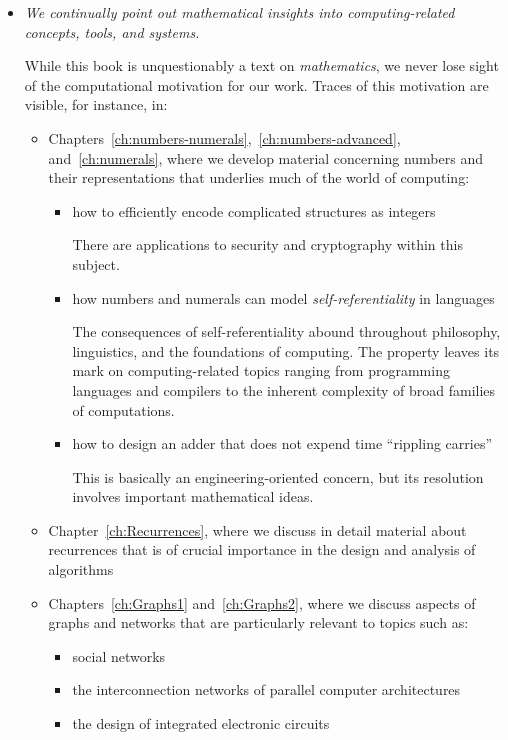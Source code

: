 \begin{itemize}
\item
{\em We continually point out mathematical insights into {\em computing-related} concepts, tools, and systems.}

\smallskip

While this book is unquestionably a text on {\em mathematics}, we never lose sight of the computational motivation for our work.  Traces of this motivation are visible, for instance, in:
  \begin{itemize}
  \item
Chapters~\ref{ch:numbers-numerals},~\ref{ch:numbers-advanced}, and~\ref{ch:numerals}, where we develop material concerning numbers and their representations that underlies much of the world of computing:
     \begin{itemize}
     \medskip\item
how to efficiently encode complicated structures as integers

\smallskip

There are applications to security and cryptography within this subject.
     \smallskip\item
how numbers and numerals can model {\em self-referentiality} in languages

\smallskip

The consequences of self-referentiality abound throughout philosophy, linguistics, and the foundations of computing.  The property leaves its mark on computing-related topics ranging from programming languages and compilers to the inherent complexity of broad families of computations.
     \medskip\item
how to design an adder that does not expend time ``rippling carries''

\smallskip

This is basically an engineering-oriented concern, but its resolution involves important mathematical ideas.
     \end{itemize}
  \smallskip\item
Chapter~\ref{ch:Recurrences}, where we discuss in detail material about recurrences that is of crucial importance in the design and analysis of algorithms
  \item
Chapters~\ref{ch:Graphs1} and~\ref{ch:Graphs2}, where we discuss aspects of graphs and networks that are particularly relevant to topics such as:
     \begin{itemize}
     \item
social networks
     \item
the interconnection networks of parallel computer architectures
     \item
the design of integrated electronic circuits
     \end{itemize}
  \end{itemize}
  

\end{itemize}
